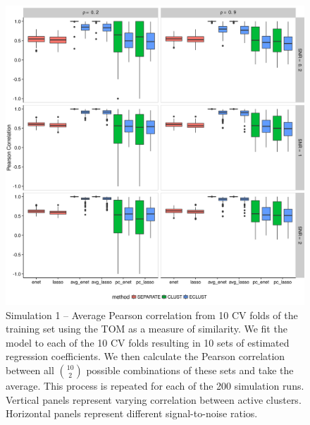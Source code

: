 \begin{figure}[H]
	\centering
	\includegraphics[scale=0.6, keepaspectratio]{./figs/hydra/results/figures/sim1-sept10/pearson_TOM_sim1.png}
	\caption{Simulation 1 -- Average Pearson correlation from 10 CV folds of the training set using the TOM as a measure of similarity. We fit the model to each of the 10 CV folds resulting in 10 sets of estimated regression coefficients. We then calculate the Pearson correlation between all $\binom{10}{2}$ possible combinations of these sets and take the average. This process is repeated for each of the 200 simulation runs. Vertical panels represent varying correlation between active clusters. Horizontal panels represent different signal-to-noise ratios.}
	\label{fig:pearson_TOM_sim1}
\end{figure}


